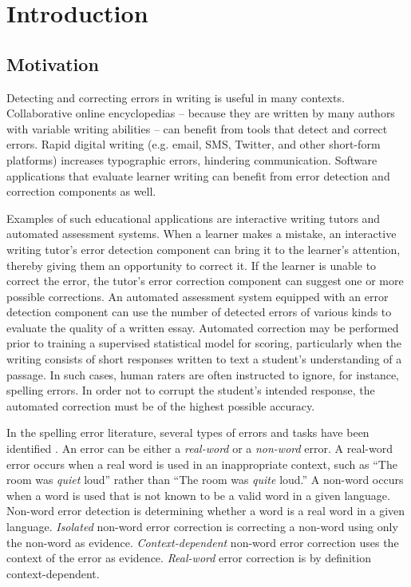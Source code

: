 \chapter{Introduction}
\label{chap:Introduction}

\section{Motivation}


Detecting and correcting errors in writing is useful in many contexts. Collaborative online encyclopedias -- because they are written by many authors with variable writing abilities -- can benefit from tools that detect and correct errors.  Rapid digital writing (e.g. email, SMS, Twitter, and other short-form platforms) increases typographic errors, hindering communication. Software applications that evaluate learner writing can benefit from error detection and correction components as well.  

Examples of such educational applications are interactive writing tutors and automated assessment systems.  When a learner makes a mistake, an interactive writing tutor's error detection component can bring it to the learner's attention, thereby giving them an opportunity to correct it.  If the learner is unable to correct the error, the tutor's error correction component can suggest one or more possible corrections.  An automated assessment system equipped with an error detection component can use the number of detected errors of various kinds to evaluate the quality of a written essay.  Automated correction may be performed prior to training a supervised statistical model for scoring, particularly when the writing consists of short responses written to text a student's understanding of a passage.  In such cases, human raters are often instructed to ignore, for instance, spelling errors.  In order not to corrupt the student's intended response, the automated correction must be of the highest possible accuracy.  

In the spelling error literature, several types of errors and tasks have been identified \cite{kukich1992techniques}.  An error can be either a \textit{real-word} or a \textit{non-word} error.  A real-word error occurs when a real word is used in an inappropriate context, such as ``The room was \textit{quiet} loud'' rather than ``The room was \textit{quite} loud.''  A non-word occurs when a word is used that is not known to be a valid word in a given language.  Non-word error detection is determining whether a word is a real word in a given language.  \textit{Isolated} non-word error correction is correcting a non-word using only the non-word as evidence.  \textit{Context-dependent} non-word error correction uses the context of the error as evidence.  \textit{Real-word} error correction is by definition context-dependent.  

